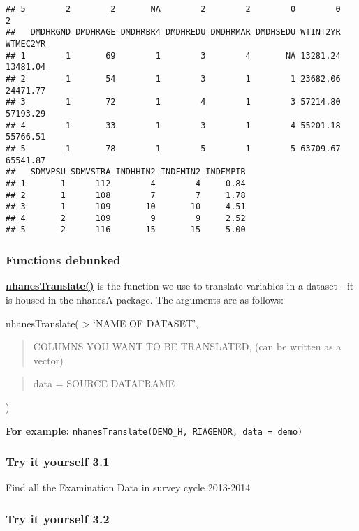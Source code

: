 \documentclass[
]{book}
\begin{document}
\begin{verbatim}
## 5        2        2       NA        2        2        0        0        2
##   DMDHRGND DMDHRAGE DMDHRBR4 DMDHREDU DMDHRMAR DMDHSEDU WTINT2YR WTMEC2YR
## 1        1       69        1        3        4       NA 13281.24 13481.04
## 2        1       54        1        3        1        1 23682.06 24471.77
## 3        1       72        1        4        1        3 57214.80 57193.29
## 4        1       33        1        3        1        4 55201.18 55766.51
## 5        1       78        1        5        1        5 63709.67 65541.87
##   SDMVPSU SDMVSTRA INDHHIN2 INDFMIN2 INDFMPIR
## 1       1      112        4        4     0.84
## 2       1      108        7        7     1.78
## 3       1      109       10       10     4.51
## 4       2      109        9        9     2.52
## 5       2      116       15       15     5.00
\end{verbatim}

\hypertarget{functions-debunked-9}{%
\subsubsection{Functions debunked}\label{functions-debunked-9}}

\href{https://www.rdocumentation.org/packages/nhanesA/versions/0.6.5.3/topics/nhanesTranslate}{\textbf{nhanesTranslate()}} is the function we use to translate variables in a dataset - it is housed in the nhanesA package. The arguments are as follows:

nhanesTranslate(
\textgreater{} `NAME OF DATASET',

\begin{quote}
COLUMNS YOU WANT TO BE TRANSLATED, (can be written as a vector)
\end{quote}

\begin{quote}
data = SOURCE DATAFRAME
\end{quote}

)

\textbf{For example:} \texttt{nhanesTranslate(\textquotesingle{}DEMO\_H\textquotesingle{},\ RIAGENDR,\ data\ =\ demo)}

\hypertarget{try-it-yourself-3.1}{%
\subsubsection{Try it yourself 3.1}\label{try-it-yourself-3.1}}

Find all the Examination Data in survey cycle 2013-2014

\hypertarget{try-it-yourself-3.2}{%
\subsubsection{Try it yourself 3.2}\label{try-it-yourself-3.2}}
\end{document}
